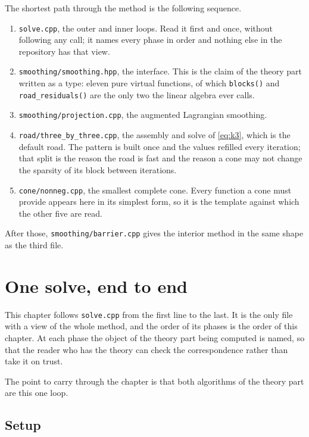 \documentclass[a4paper,11pt]{book}
\theoremstyle{plain}
\theoremstyle{definition}
\theoremstyle{remark}
\numberwithin{equation}{chapter}
\numberwithin{algorithm}{chapter}
\begin{document}
	The shortest path through the method is the following sequence.

	\begin{enumerate}[leftmargin=*]
		\item \texttt{solve.cpp}, the outer and inner loops. Read it first
		and once, without following any call; it names every phase in order and
		nothing else in the repository has that view.
		\item \texttt{smoothing/smoothing.hpp}, the interface. This is the
		claim of the theory part written as a type: eleven pure virtual functions,
		of which \texttt{blocks()} and \texttt{road\_residuals()} are the only two
		the linear algebra ever calls.
		\item \texttt{smoothing/projection.cpp}, the augmented Lagrangian
		smoothing.
		\item \texttt{road/three\_by\_three.cpp}, the assembly and solve of
		\eqref{eq:k3}, which is the default road. The pattern is built once and the values refilled every
		iteration; that split is the reason the road is fast and the reason a cone
		may not change the sparsity of its block between iterations.
		\item \texttt{cone/nonneg.cpp}, the smallest complete cone. Every
		function a cone must provide appears here in its simplest form, so it is
		the template against which the other five are read.
	\end{enumerate}

	After those, \texttt{smoothing/barrier.cpp} gives the interior method in the
	same shape as the third file.

	\chapter{One solve, end to end}\label{ch:onesolve}

	This chapter follows \texttt{solve.cpp} from the first line to the last. It is
	the only file with a view of the whole method, and the order of its phases is
	the order of this chapter. At each phase the object of the theory part being
	computed is named, so that the reader who has the theory can check the
	correspondence rather than take it on trust.

	The point to carry through the chapter is that both algorithms of the theory
	part are this one loop. 

	\section{Setup}
\end{document}

